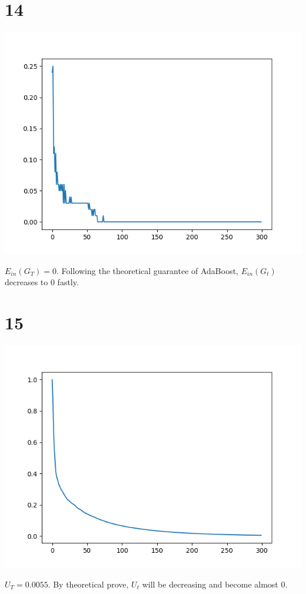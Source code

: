 \documentclass[12pt]{article}
\begin{document}
\section*{14}
\begin{center}
    \includegraphics[scale=0.5]{p14.png}
\end{center}
$E_{in}(G_T) = 0$. Following the theoretical guarantee of AdaBoost, $E_{in}(G_t)$ decreases to $0$ fastly.

\section*{15}
\begin{center}
    \includegraphics[scale=0.5]{p15.png}
\end{center}
$U_T = 0.0055$. By theoretical prove, $U_t$ will be decreasing and become almost $0$.
\end{document}
